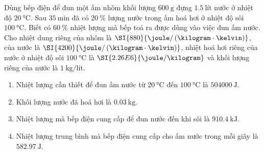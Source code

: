 \begin{ex}
	Dùng bếp điện để đun một ấm nhôm khối lượng $\SI{600}{\gram}$ đựng $\SI{1.5}{\text{lít}}$ nước ở nhiệt độ $\SI{20}{\celsius}$. Sau $\SI{35}{\minute}$ đã có $\SI{20}{\percent}$ lượng nước trong ấm hoá hơi ở nhiệt độ sôi $\SI{100}{\celsius}$. Biết có $\SI{60}{\percent}$ nhiệt lượng mà bếp toả ra được dùng vào việc đun ấm nước. Cho nhiệt dung riêng của nhôm là $\SI{880}{\joule/\left(\kilogram\cdot\kelvin\right)}$, của nước là $\SI{4200}{\joule/\left(\kilogram\cdot\kelvin\right)}$, nhiệt hoá hơi riêng của nước ở nhiệt độ sôi $\SI{100}{\celsius}$ là $\SI{2.26E6}{\joule/\kilogram}$ và khối lượng riêng của nước là $\SI{1}{\kilogram/\text{lít}}$.
	\begin{enumerate}[label=\alph*)]
		\item Nhiệt lượng cần thiết để đun ấm nước từ $\SI{20}{\celsius}$ đến $\SI{100}{\celsius}$ là $\SI{504000}{\joule}$.
		\item Khối lượng nước đã hoá hơi là $\SI{0.03}{\kilogram}$.
		\item Nhiệt lượng mà bếp điện cung cấp để đun nước đến khi sôi là $\SI{910.4}{\kilo\joule}$.
		\item Nhiệt lượng trung bình mà bếp điện cung cấp cho ấm nước trong mỗi giây là $\SI{582.97}{\joule}$.
	\end{enumerate}
\end{ex}
